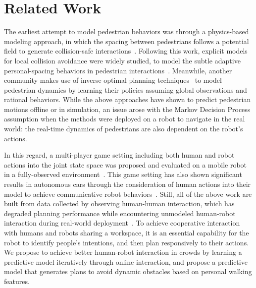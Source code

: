 \documentclass[conference]{IEEEtran}
\begin{document}


\vspace{-0.2em}
\section{Related Work}
\label{sec:related}
\vspace{-0.4em}
The earliest attempt to model pedestrian behaviors was through a physics-based 
modeling approach, in which the spacing between pedestrians follows a 
potential field to generate collision-safe 
interactions~\cite{helbing1995social}. Following this work, explicit models 
for local collision avoidance were widely studied, to model the subtle 
adaptive personal-spacing behaviors in pedestrian 
interactions~\cite{papadakis2014adaptive}. Meanwhile, another community 
makes use of inverse optimal planning 
techniques~\cite{ziebart2009planning,henry2010learning,vasquez2014inverse} to 
model pedestrian dynamics by learning their policies assuming global observations and 
rational behaviors.
While the above approaches have shown to predict pedestrian motions 
offline or in simulation, an issue arose with the Markov Decision 
Process assumption when the methods were deployed on a robot to navigate in the real world:
the real-time dynamics of pedestrians are also dependent on the robot's 
actions. 

In this regard, a multi-player game setting including both human and robot actions into the joint state space was proposed and evaluated on a mobile robot in a fully-observed environment~\cite{trautman2010unfreezing}. This game setting has also shown significant results in autonomous cars through the consideration of human actions into their model to achieve communicative robot behaviors~\cite{sadigh2016planning}.
Still, all of the above work are built from data collected by observing human-human 
interaction, which has degraded planning performance while encountering unmodeled 
human-robot interaction during real-world 
deployment~\cite{trautman2015robot, pfeiffer2016predicting}. To achieve 
cooperative interaction with humans and robots sharing a workspace, it is 
an essential capability for the robot to identify people's 
intentions, and then plan responsively to their actions. We propose to achieve 
better human-robot interaction in crowds by learning a predictive model 
iteratively through online interaction, and propose a predictive model 
that generates plans to avoid dynamic obstacles based on personal walking features. 
\vspace{-0.1em}
\end{document}
